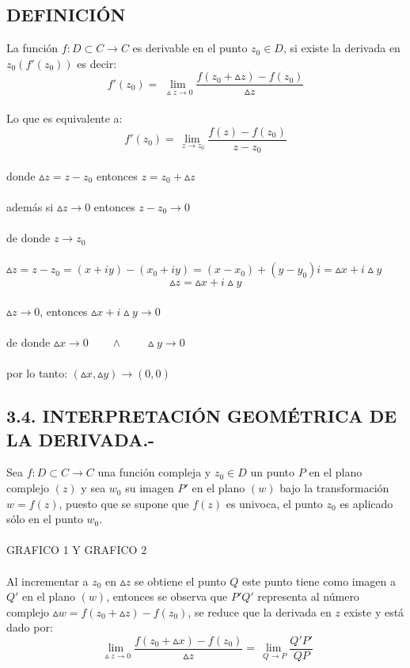 \documentclass[10pt,a4paper]{book}
\begin{document}
\subsection{DEFINICIÓN}
La función $f:D \subset C \rightarrow C$ es derivable en el punto $z_0 \in  D$, si existe la derivada en $z_0 (f'(z_0))$ es decir:
\\
$$f'(z_0)= \lim\limits_{\ \vartriangle z \rightarrow 0}\frac{f(z_0+\vartriangle z)-f(z_0)}{\vartriangle z}$$
\\ 
Lo que es equivalente a:
\\
$$f'(z_0)= \lim\limits_{\ z \rightarrow z_0}\frac{f(z)-f(z_0)}{z-z_0}$$
\\
donde $\vartriangle z=z-z_0$ entonces $z=z_0+\vartriangle z$
\\
\\
además si $\vartriangle z \rightarrow 0$ entonces $z-z_0 \rightarrow 0$
\\
\\
de donde $z \rightarrow z_0$
\\
\\
$\vartriangle z=z-z_0=(x+iy)-(x_0+iy)=(x-x_0)+(y-y_0)i=\vartriangle x +i\vartriangle y$
\\
$$ \vartriangle z=\vartriangle x+i\vartriangle y$$
\\
$\vartriangle z \rightarrow 0$, entonces $\vartriangle x+i\vartriangle y \rightarrow 0$
\\
\\
de donde $\vartriangle x \rightarrow 0 \qquad \wedge \qquad \vartriangle y \rightarrow 0$
\\
\\
por lo tanto: $(\vartriangle x,\vartriangle y)\rightarrow (0,0)$
\subsection{3.4. INTERPRETACIÓN GEOMÉTRICA DE LA DERIVADA.-}
Sea $f:D \subset C \rightarrow C$ una función compleja y $z_0 \in D$ un punto $P$ en el plano complejo $(z)$ y sea $w_0$ su imagen $P'$ en el plano $(w)$ bajo la transformación $w=f(z)$, puesto que se supone que $f(z)$ es univoca, el punto $z_0$ es aplicado sólo en el punto $w_0$.
\\
\\
GRAFICO 1 Y GRAFICO 2
\\
\\
Al incrementar a $z_0$ en $\vartriangle z$ se obtiene el punto $Q$ este punto tiene como imagen a $Q'$ en el plano $(w)$, entonces se observa que $P'Q'$ representa al número complejo $\vartriangle w=f(z_0+\vartriangle z)-f(z_0)$, se reduce que la derivada en $z$ existe y está dado por:
\\
$$\lim\limits_{\ \vartriangle z \rightarrow 0}\frac{f(z_0+\vartriangle x)-f(z_0)}{\vartriangle z}=\lim\limits_{\ Q \rightarrow P}\frac{Q'P'}{QP}$$
\end{document}
